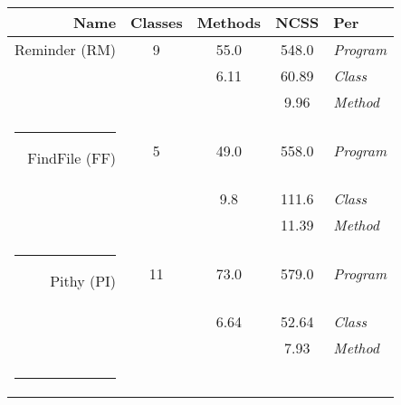 

\vspace*{-.1in}

\begin{center}
\begin{table}[h]

\begin{center}

\begin{tabular}{r | c | c | c | l} 

{\bf Name} & {\bf Classes} & {\bf Methods} & {\bf NCSS} & {\bf Per} \\
\hline

{Reminder} ({RM}) 
& 9               & 55.0          & 548.0       & {\em Program}
\\ \hline

         &                 & 6.11          & 60.89       & {\em Class}
\\ \hline

         &                 &               & 9.96       & {\em Method} 
\\ [.01in] \hline \hline 

\rule{-.1in}{20pt}

{FindFile} ({FF})
 & 5               & 49.0          & 558.0       & {\em Program}
\\ \hline

         &                 & 9.8           & 111.6       & {\em Class}
\\ \hline

         &                 &               & 11.39       & {\em Method} 
\\ [.01in] \hline \hline 

\rule{-.1in}{20pt}

{Pithy} ({PI}) 
& 11              & 73.0          & 579.0       & {\em Program}
\\ \hline

         &                 & 6.64          & 52.64       & {\em Class}
\\ \hline

         &                 &               & 7.93       & {\em Method} 
\\ [.01in] \hline \hline 
\rule{-.1in}{20pt}



\end{tabular}
\end{center}
\end{table}
\end{center}
